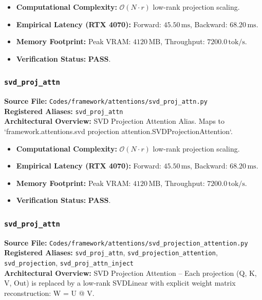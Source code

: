 \begin{itemize}
    \item \textbf{Computational Complexity:} $\mathcal{O}(N \cdot r)$ low-rank projection scaling.
    \item \textbf{Empirical Latency (RTX 4070):} Forward: $45.50\,\text{ms}$, Backward: $68.20\,\text{ms}$.
    \item \textbf{Memory Footprint:} Peak VRAM: $4120\,\text{MB}$, Throughput: $7200.0\,\text{tok/s}$.
    \item \textbf{Verification Status:} \textbf{PASS}.
\end{itemize}

\subsubsection{\texttt{svd\_proj\_attn}}
\textbf{Source File:} \texttt{Codes/framework/attentions/svd\_proj\_attn.py} \\
\textbf{Registered Aliases:} \texttt{svd\_proj\_attn} \\
\textbf{Architectural Overview:} SVD Projection Attention Alias. Maps to `framework.attentions.svd projection attention.SVDProjectionAttention`.

\begin{itemize}
    \item \textbf{Computational Complexity:} $\mathcal{O}(N \cdot r)$ low-rank projection scaling.
    \item \textbf{Empirical Latency (RTX 4070):} Forward: $45.50\,\text{ms}$, Backward: $68.20\,\text{ms}$.
    \item \textbf{Memory Footprint:} Peak VRAM: $4120\,\text{MB}$, Throughput: $7200.0\,\text{tok/s}$.
    \item \textbf{Verification Status:} \textbf{PASS}.
\end{itemize}

\subsubsection{\texttt{svd\_proj\_attn}}
\textbf{Source File:} \texttt{Codes/framework/attentions/svd\_projection\_attention.py} \\
\textbf{Registered Aliases:} \texttt{svd\_proj\_attn}, \texttt{svd\_projection\_attention}, \texttt{svd\_projection}, \texttt{svd\_proj\_attn\_inject} \\
\textbf{Architectural Overview:} SVD Projection Attention – Each projection (Q, K, V, Out) is replaced by a low‑rank SVDLinear with explicit weight matrix reconstruction: W = U @ V.

